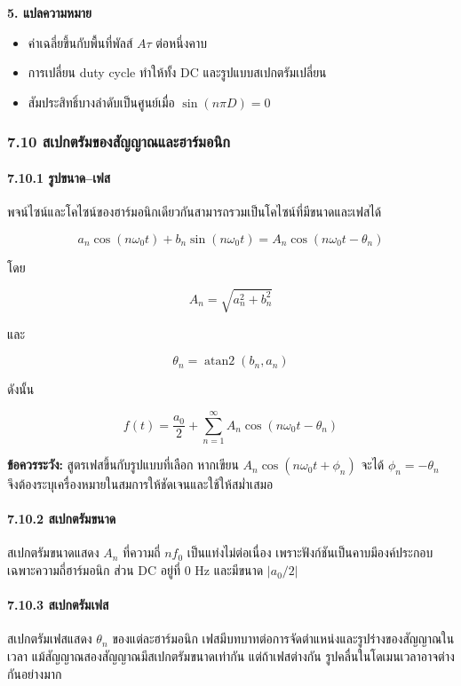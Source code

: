 \textbf{5. แปลความหมาย}

\begin{itemize}
\item
  ค่าเฉลี่ยขึ้นกับพื้นที่พัลส์ \(A\tau\) ต่อหนึ่งคาบ
\item
  การเปลี่ยน duty cycle ทำให้ทั้ง DC และรูปแบบสเปกตรัมเปลี่ยน
\item
  สัมประสิทธิ์บางลำดับเป็นศูนย์เมื่อ \(\sin(n\pi D)=0\)
\end{itemize}

\subsubsection{7.10 สเปกตรัมของสัญญาณและฮาร์มอนิก}

\paragraph{7.10.1 รูปขนาด--เฟส}

พจน์ไซน์และโคไซน์ของฮาร์มอนิกเดียวกันสามารถรวมเป็นโคไซน์ที่มีขนาดและเฟสได้

\[
a_n\cos(n\omega_0t)+b_n\sin(n\omega_0t)
=A_n\cos(n\omega_0t-\theta_n)
\]

โดย

\[
A_n=\sqrt{a_n^2+b_n^2}
\]

และ

\[
\theta_n=\operatorname{atan2}(b_n,a_n)
\]

ดังนั้น

\[
f(t)=\frac{a_0}{2}+\sum_{n=1}^{\infty}A_n\cos(n\omega_0t-\theta_n)
\]

\textbf{ข้อควรระวัง:} สูตรเฟสขึ้นกับรูปแบบที่เลือก หากเขียน \(A_n\cos(n\omega_0t+\phi_n)\) จะได้ \(\phi_n=-\theta_n\) จึงต้องระบุเครื่องหมายในสมการให้ชัดเจนและใช้ให้สม่ำเสมอ

\paragraph{7.10.2 สเปกตรัมขนาด}

สเปกตรัมขนาดแสดง \(A_n\) ที่ความถี่ \(nf_0\) เป็นแท่งไม่ต่อเนื่อง เพราะฟังก์ชันเป็นคาบมีองค์ประกอบเฉพาะความถี่ฮาร์มอนิก ส่วน DC อยู่ที่ 0 Hz และมีขนาด \(|a_0/2|\)

\paragraph{7.10.3 สเปกตรัมเฟส}

สเปกตรัมเฟสแสดง \(\theta_n\) ของแต่ละฮาร์มอนิก เฟสมีบทบาทต่อการจัดตำแหน่งและรูปร่างของสัญญาณในเวลา แม้สัญญาณสองสัญญาณมีสเปกตรัมขนาดเท่ากัน แต่ถ้าเฟสต่างกัน รูปคลื่นในโดเมนเวลาอาจต่างกันอย่างมาก

